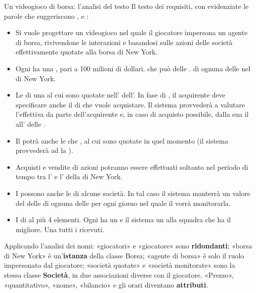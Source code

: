 \begin{esempio}{Un videogioco di borsa: l'analisi del testo}
Il testo dei requisiti, con evidenziate le parole che suggeriscono ,  e
:

\begin{itemize}\small
  \item Si vuole progettare un videogioco nel quale il giocatore impersona un agente di borsa, rivivendone le interazioni e
        basandosi sulle azioni delle società effettivamente quotate alla borsa di New York.
  \item Ogni  ha una , pari a 100 milioni di dollari, che può  delle .  di ognuna delle  nel   di New York.
  \item Le  di una   al  cui sono quotate nell'
        dell'. In fase di , il  acquirente deve specificare anche il  di
         che vuole acquistare. Il sistema provvederà a valutare l'effettiva  da parte
        dell'acquirente e, in caso di acquisto possibile,  dalla sua  il 
        all' delle .
  \item Il  potrà anche  le  che , al  cui sono quotate in quel
        momento (il sistema provvederà ad  la ).
  \item Acquisti e vendite di azioni potranno essere effettuati soltanto nel periodo di tempo tra l' e
        l' della  di New York.
  \item I  possono anche  le  di alcune società. In tal caso il sistema
        manterrà un valore del  delle  di ognuna delle  per ogni giorno nel quale il
         vorrà monitorarla.
  \item I    di al più 4 elementi. Ogni  ha un  e il
        sistema  un  alla squadra che ha il  migliore. Una 
         tutti i  ricevuti.
\end{itemize}
Applicando l'analisi dei nomi: «giocatori» e «giocatore» sono \textbf{ridondanti}; «borsa di New York» è un'\textbf{istanza} della
classe Borsa; «agente di borsa» è solo il ruolo impersonato dal giocatore; «società quotate» e «società monitorate» sono la stessa
classe \textbf{Società}, in due associazioni diverse con il giocatore. «Prezzo», «quantitativo», «nome», «bilancio» e gli orari
diventano \textbf{attributi}.
\end{esempio}

